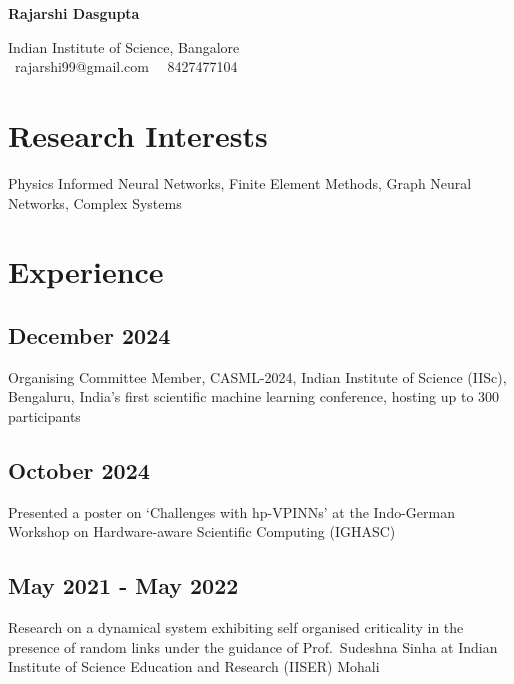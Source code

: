 \documentclass{article}
\newcommand{\theauthor}{Rajarshi Dasgupta}
\begin{document}
\begin{center}
	{\bf \huge \theauthor}

	\vspace{1em}

	Indian Institute of Science, Bangalore\\
	\faEnvelopeO \, rajarshi99@gmail.com \,
	\faPhone \, 8427477104
\end{center}

\section{Research Interests}

Physics Informed Neural Networks,
Finite Element Methods,
Graph Neural Networks,
Complex Systems

\section{Experience}

\subsection{December 2024}
Organising Committee Member, CASML-2024, Indian Institute of Science (IISc), Bengaluru,
India's first scientific machine learning conference, hosting up to 300 participants

\subsection{October 2024}
Presented a poster on `Challenges with hp-VPINNs'
at the Indo-German Workshop on Hardware-aware Scientific Computing (IGHASC)

\subsection{May 2021 - May 2022}
Research on a dynamical system
exhibiting self organised criticality
in the presence of random links
under the guidance of Prof.~Sudeshna Sinha
at Indian Institute of Science Education and Research (IISER)
Mohali

\end{document}

